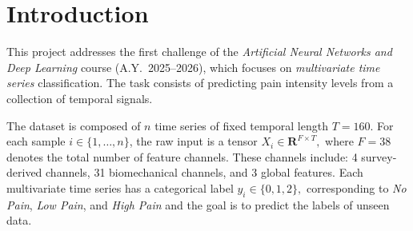 \vspace{-30pt}
\section{Introduction}
\vspace{-10pt}

This project addresses the first challenge of the \textit{Artificial Neural Networks and Deep Learning} course (A.Y.\ 2025--2026), which focuses on \emph{multivariate time series} classification. The task consists of predicting pain intensity levels from a collection of temporal signals.

The dataset is composed of $n$ time series of fixed temporal length $T = 160$. For each sample $i \in \{1,\dots,n\}$, the raw input is a tensor $X_i \in \mathbf{R}^{F \times T},$ where $F = 38$ denotes the total number of feature channels. These channels include: 4 survey-derived channels, 31 biomechanical channels, and 3 global features. Each multivariate time series has a categorical label $y_i \in \{0,1,2\},$ corresponding to \emph{No Pain}, \emph{Low Pain}, and \emph{High Pain} and the goal is to predict the labels of unseen data.

